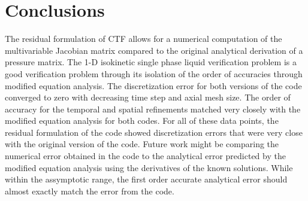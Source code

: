 \documentclass{mc2015}
\begin{document}
%
%
%
%
%
%
%
%

\section{Conclusions}

The residual formulation of CTF allows for a numerical computation of the
multivariable Jacobian matrix compared to the original analytical derivation of
a pressure matrix. The 1-D isokinetic single phase liquid verification problem
is a good verification problem through its isolation of the order
of accuracies through modified equation analysis. The discretization error for
both versions of the code converged to zero with decreasing time step and axial
mesh size. The order of accuracy for the temporal and spatial refinements
matched very closely with the modified equation analysis for both codes. For all
of these data points, the residual formulation of the code showed discretization
errors that were very close with the original version of the code. Future work
might be comparing the numerical error obtained in the code to the analytical
error predicted by the modified equation analysis using the derivatives of the
known solutions. While within the assymptotic range, the first order accurate
analytical error should almost exactly match the error from the code.
\end{document}
